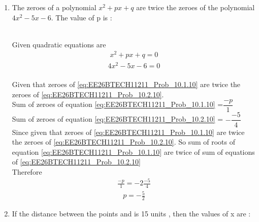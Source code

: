 \begin{enumerate}[label=\thesubsection.\arabic*, ref=\thesubsection.\theenumi]
\item
 The zeroes of a polynomial $x^2 + px + q$ are twice the zeroes of the polynomial $4x^2 - 5x - 6$. The value of p is :
 \begin{enumerate}
\end{enumerate}
\solution
\\Given quadratic equations are 
\begin{align}
x^2 + px + q=0 \label{eq:EE26BTECH11211_Prob_10.1.10}
\end{align} 
\begin{align}
4x^2 - 5x - 6=0  \label{eq:EE26BTECH11211_Prob_10.2.10}
\end{align} 
\\Given that zeroes of \eqref{eq:EE26BTECH11211_Prob_10.1.10} are twice the zeroes of \eqref{eq:EE26BTECH11211_Prob_10.2.10}.
\\Sum of zeroes of equation \eqref{eq:EE26BTECH11211_Prob_10.1.10} =$ \dfrac{-p}{1}$ 
\\Sum of zeroes of equation \eqref{eq:EE26BTECH11211_Prob_10.2.10} = $-\dfrac{-5}{4}$ 
\\Since given that zeroes of \eqref{eq:EE26BTECH11211_Prob_10.1.10} are twice the zeroes of \eqref{eq:EE26BTECH11211_Prob_10.2.10}. So sum of roots of  equation \eqref{eq:EE26BTECH11211_Prob_10.1.10} are twice of sum of equations of \eqref{eq:EE26BTECH11211_Prob_10.2.10}
\\Therefore \begin{align}
\frac{-p}{1} = -2\frac{-5}{4}
\end{align}
\begin{align}
 p = -\frac{5}{2}
\end{align}

\item
If the distance between the points  and  is 15 units , then the values of x are :
\begin{enumerate}
\end{enumerate}


\end{enumerate}

